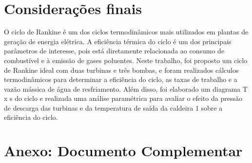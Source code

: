 \documentclass[
	article,			%
	11pt,				%
	oneside,			%
	a4paper,			%
	english,			%
	brazil,				%
	sumario=tradicional
	]{abntex2}
\begin{document}
%

\section{Considerações finais}

O ciclo de Rankine é um dos ciclos termodinâmicos mais utilizados em plantas de geração de energia elétrica. A eficiência térmica do ciclo é um dos principais parâmetros de interesse, pois está diretamente relacionada ao consumo de combustível e à emissão de gases poluentes. Neste trabalho, foi proposto um ciclo de Rankine ideal com duas turbinas e três bombas, e foram realizados cálculos termodinâmicos para determinar a eficiência do ciclo, as taxas de trabalho e a vazão mássica de água de resfriamento. Além disso, foi elaborado um diagrama T x s do ciclo e realizada uma análise paramétrica para avaliar o efeito da pressão de descarga das turbinas e da temperatura de saída da caldeira 1 sobre a eficiência do ciclo.


\section{Anexo: Documento Complementar}
\clearpage
\label{anexo:pdf}



\postextual

\clearpage

\end{document}

